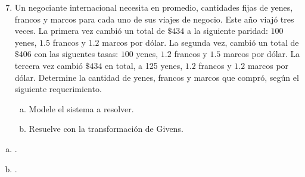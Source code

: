 \begin{frame}
	\begin{enumerate}\setcounter{enumi}{6}
		\item

		      Un negociante internacional necesita en promedio,
		      cantidades fijas de yenes, francos y marcos para cada uno
		      de sus viajes de negocio.
		      Este año viajó tres veces.
		      La primera vez cambió un total de $\$434$ a la siguiente
		      paridad: $100$ yenes, $1.5$ francos y $1.2$ marcos por
		      dólar.
		      La segunda vez, cambió un total de $\$ 406$ con las
		      siguentes tasas: $100$ yenes, $1.2$ francos y $1.5$ marcos
		      por dólar.
		      La tercera vez cambió $\$ 434$ en total, a 125 yenes, $1.2$
		      francos y $1.2$ marcos por dólar.
		      Determine la cantidad de yenes, francos y marcos que
		      compró, según el siguiente requerimiento.

		      \begin{multicols}{2}
			      \begin{enumerate}[a)]
				      \item

				            Modele el sistema a resolver.

				      \item

				            Resuelve con la transformación de Givens.
			      \end{enumerate}
		      \end{multicols}
	\end{enumerate}

	\begin{solution}
		\begin{multicols}{2}
			\begin{enumerate}[a)]
				\item

				      .

				\item

				      .
			\end{enumerate}
		\end{multicols}
	\end{solution}
\end{frame}